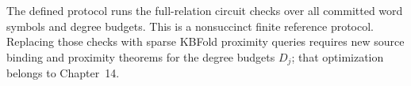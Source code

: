 \begin{remark}
The defined protocol runs the
full-relation circuit checks
over all committed word symbols
and degree budgets. This is a
nonsuccinct finite reference
protocol. Replacing those
checks with sparse KBFold
proximity queries requires
new source binding and
proximity theorems for
the degree budgets $D_j$;
that optimization belongs to
Chapter~14.
\end{remark}
